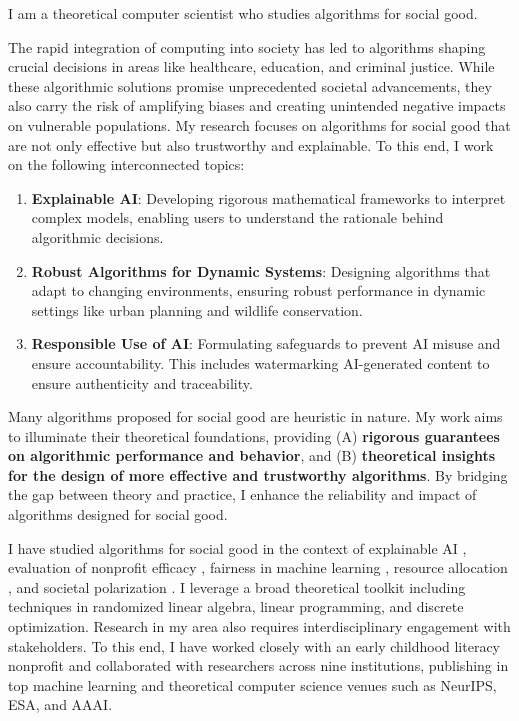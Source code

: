 \documentclass[11pt]{article}
\begin{document}
{\setlength{\parindent}{0cm}
I am a theoretical computer scientist who studies algorithms for social good.

The rapid integration of computing into society has led to algorithms shaping crucial decisions in areas like healthcare, education, and criminal justice. While these algorithmic solutions promise unprecedented societal advancements, they also carry the risk of amplifying biases and creating unintended negative impacts on vulnerable populations. My research focuses on algorithms for social good that are not only effective but also trustworthy and explainable.
To this end, I work on the following interconnected topics:
\begin{enumerate}
    \item \textbf{Explainable AI}: Developing rigorous mathematical frameworks to interpret complex models, enabling users to understand the rationale behind algorithmic decisions.
    \item \textbf{Robust Algorithms for Dynamic Systems}: Designing algorithms that adapt to changing environments, ensuring robust performance in dynamic settings like urban planning and wildlife conservation.
    \item \textbf{Responsible Use of AI}: Formulating safeguards to prevent AI misuse and ensure accountability. This includes watermarking AI-generated content to ensure authenticity and traceability.
\end{enumerate}

Many algorithms proposed for social good are heuristic in nature. My work aims to illuminate their theoretical foundations, providing (A) \textbf{rigorous guarantees on algorithmic performance and behavior}, and (B) \textbf{theoretical insights for the design of more effective and trustworthy algorithms}.
By bridging the gap between theory and practice, I enhance the reliability and impact of algorithms designed for social good.

I have studied algorithms for social good in the context of explainable AI \cite{musco2024leverage,liu2024kernel}, evaluation of nonprofit efficacy \cite{witter2024benchmarking}, fairness in machine learning \cite{rosenblatt2023counterfactual,witter2024fairlyuncertain}, resource allocation \cite{hellerstein2022local,witter2024i,witter2024minimizing}, and societal polarization \cite{musco2022quantify}. I leverage a broad theoretical toolkit including techniques in randomized linear algebra, linear programming, and discrete optimization. Research in my area also requires interdisciplinary engagement with stakeholders. To this end, I have worked closely with an early childhood literacy nonprofit and collaborated with researchers across nine institutions, publishing in top machine learning and theoretical computer science venues such as NeurIPS, ESA, and AAAI.

}
\end{document}
